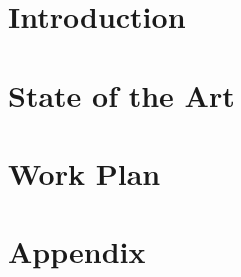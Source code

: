 \documentclass[twoside,openright,titlepage,numbers=noenddot,headinclude,
               footinclude=true,cleardoublepage=empty,abstractoff,
               BCOR=5mm,paper=a4,fontsize=11pt,ngerman,american,]{scrreprt}
\begin{document}
\frenchspacing
\raggedbottom
{}
\pagestyle{plain}



\pagestyle{scrheadings}



\cleardoublepage
\ctparttext{}
\part{Introduction}


% 

\cleardoublepage
\ctparttext{}
\part{State of the Art}







\cleardoublepage
\ctparttext{}
\part{Work Plan}

% 
% 
% 
% 
% 
% 
\appendix
\cleardoublepage
\part{Appendix}


% 
\end{document}
